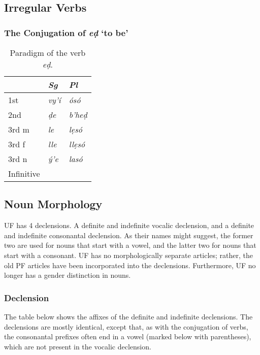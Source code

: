 \documentclass[a4paper, 12pt, oneside, final]{article}
\let \nf \normalfont
\begin{document}
\subsection{Irregular Verbs}\label{subsec:irregular-verbs}
\subsubsection{The Conjugation of \textit{eḍ} ‘to be’}

\begin{table}[h]
\centering
\noindent\begin{tabular}{@{}|>{}l|>{\it}l|>{\it}l|}\hline
&\nf Sg&\nf Pl\\\hline
1st       & vy’í & ósó \\\hline
2nd       & ḍe   & b’heḍ \\\hline
3rd m     & le   & lẹsó \\\hline
3rd f     & lle  & llẹsó \\\hline
3rd n     & ý’e  & lasó \\\hline
Infinitive& \multicolumn{2}{c|}{\it éḍ} \\\hline
\end{tabular}
\caption{Paradigm of the verb \emph{eḍ}.}\label{tab:ed-paradigm}
\end{table}

\subsection{Noun Morphology}\label{subsec:noun-morphology}
UF has 4 declensions. A definite and indefinite vocalic declension, and a definite and indefinite consonantal declension.
As their names might suggest, the former two are used for nouns that start with a vowel, and the latter two for nouns
that start with a consonant. UF has no morphologically separate articles; rather, the old PF articles have been incorporated
into the declensions. Furthermore, UF no longer has a gender distinction in nouns.

\subsubsection{Declension}
The table below shows the affixes of the definite and indefinite declensions. The declensions are mostly identical,
except that, as with the conjugation of verbs, the consonantal prefixes often end in a vowel (marked below with
parentheses), which are not present in the vocalic declension.
\end{document}
